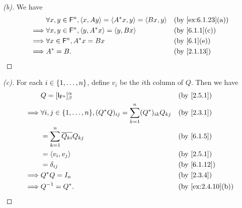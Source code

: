 \begin{proof}[(b)]
  We have
  \begin{align*}
             & \forall x, y \in \vs{F}^n, \inn{x, Ay} = \inn{A^* x, y} = \inn{Bx, y} &  & \text{(by \cref{ex:6.1.23}(a))} \\
    \implies & \forall x, y \in \vs{F}^n, \inn{y, A^* x} = \inn{y, Bx}               &  & \text{(by \cref{6.1.1}(c))}     \\
    \implies & \forall x \in \vs{F}^n, A^* x = Bx                                    &  & \text{(by \cref{6.1}(e))}       \\
    \implies & A^* = B.                                                              &  & \text{(by \cref{2.1.13})}
  \end{align*}
\end{proof}

\begin{proof}[(c)]
  For each \(i \in \left\lbrace1, \dots, n\right\rbrace\), define \(v_i\) be the \(i\)th column of \(Q\).
  Then we have
  \begin{align*}
             & Q = [\IT[\vs{F}^n]]_{\beta}^{\alpha}                                                   &  & \text{(by \cref{2.5.1})}        \\
    \implies & \forall i, j \in \set{1, \dots, n}, (Q^* Q)_{i j} = \sum_{k = 1}^n (Q^*)_{i k} Q_{k j} &  & \text{(by \cref{2.3.1})}        \\
             & = \sum_{k = 1}^n \conj{Q_{k i}} Q_{k j}                                                &  & \text{(by \cref{6.1.5})}        \\
             & = \inn{v_i, v_j}                                                                       &  & \text{(by \cref{2.5.1})}        \\
             & = \delta_{i j}                                                                         &  & \text{(by \cref{6.1.12})}       \\
    \implies & Q^* Q = I_n                                                                            &  & \text{(by \cref{2.3.4})}        \\
    \implies & Q^{-1} = Q^*.                                                                          &  & \text{(by \cref{ex:2.4.10}(b))}
  \end{align*}
\end{proof}

